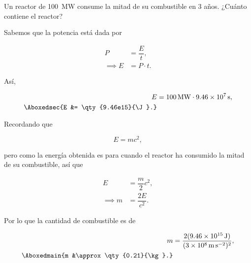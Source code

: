 \documentclass[./../main.tex]{subfiles}
\begin{document}
    \begin{exercise}
        Un reactor de \qty{100}{\MW} consume la mitad de su combustible en 3 años. ¿Cuánto  contiene el reactor?

        \begin{solution}
            Sabemos que la potencia está dada por

            \begin{align*}
                P &= \dfrac{E}{t},\\
                \implies E &= P \cdot t.
            \end{align*}

            Así,

            \begin{align*}
                E &= \qty{100}{\MW} \cdot \qty{9.46e7}{\s},\\
                \Aboxedsec{E &= \qty{9.46e15}{\J}.}
            \end{align*}

            Recordando que

            \begin{equation*}
                E = mc^{2},
            \end{equation*}

            pero como la energía obtenida es para cuando el reactor ha consumido la mitad de su combustible, así que

            \begin{align*}
                E &= \dfrac{m}{2}c^{2},\\
                \implies m &= \dfrac{2E}{c^{2}}.
            \end{align*}

            Por lo que la cantidad de combustible es de

            \begin{align*}
                m &= \dfrac{2(\qty{9.46e15}{\J})}{(\qty{3e8}{\m\per\s\squared})^{2}},\\
                \Aboxedmain{m &\approx \qty{0.21}{\kg}.}
            \end{align*}
        \end{solution}
    \end{exercise}
\end{document}
